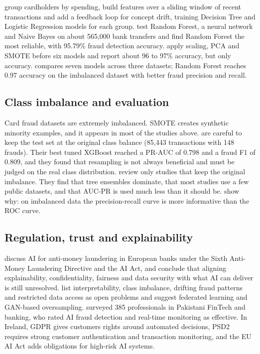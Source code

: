 \documentclass[12pt,a4paper]{article}
\begin{document}
\citet{appavu2025ai} group cardholders by spending, build features over a sliding window of recent transactions and add a feedback loop for concept drift, training Decision Tree and Logistic Regression models for each group. \citet{preciado2025banking} test Random Forest, a neural network and Naive Bayes on about 565{,}000 bank transfers and find Random Forest the most reliable, with 95.79\% fraud detection accuracy. \citet{haider2024pca} apply scaling, PCA and SMOTE before six models and report about 96 to 97\% accuracy, but only accuracy. \citet{alrasheedi2025enhancing} compares seven models across three datasets; Random Forest reaches 0.97 accuracy on the imbalanced dataset with better fraud precision and recall.

\subsection{Class imbalance and evaluation}
Card fraud datasets are extremely imbalanced. SMOTE \citep{chawla2002smote} creates synthetic minority examples, and it appears in most of the studies above. \citet{ma2026leakage} are careful to keep the test set at the original class balance (85{,}443 transactions with 148 frauds). Their best tuned XGBoost reached a PR-AUC of 0.798 and a fraud F1 of 0.809, and they found that resampling is not always beneficial and must be judged on the real class distribution. \citet{baisholan2025review} review only studies that keep the original imbalance. They find that tree ensembles dominate, that most studies use a few public datasets, and that AUC-PR is used much less than it should be. \citet{saito2015precision} show why: on imbalanced data the precision-recall curve is more informative than the ROC curve.

\subsection{Regulation, trust and explainability}
\citet{horobets2025aml} discuss AI for anti-money laundering in European banks under the Sixth Anti-Money Laundering Directive and the AI Act, and conclude that aligning explainability, confidentiality, fairness and data security with what AI can deliver is still unresolved. \citet{bian2025review} list interpretability, class imbalance, drifting fraud patterns and restricted data access as open problems and suggest federated learning and GAN-based oversampling. \citet{khan2026fintech} surveyed 385 professionals in Pakistani FinTech and banking, who rated AI fraud detection and real-time monitoring as effective. In Ireland, GDPR \citep{gdpr2016} gives customers rights around automated decisions, PSD2 \citep{psd2015} requires strong customer authentication and transaction monitoring, and the EU AI Act \citep{euaiact2024} adds obligations for high-risk AI systems.
\end{document}
